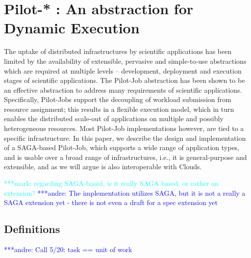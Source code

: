 \documentclass[]{article}
\newcommand{\jhanote}[1]{ {\textcolor{red} { ***shantenu: #1 }}}
\newcommand{\alnote}[1]{ {\textcolor{blue} { ***andre: #1 }}}
\newcommand{\msnote}[1]{ {\textcolor{cyan} { ***mark: #1 }}}
\newcommand{\alnote}[1]{}
\newcommand{\jhanote}[1]{}
\begin{document}
\section{Pilot-* : An abstraction for Dynamic Execution}

The uptake of distributed infrastructures by scientific applications
has been limited by the availability of extensible, pervasive and
simple-to-use abstractions which are required at multiple levels –
development, deployment and execution stages of scientific
applications. The Pilot-Job abstraction has been shown to be an
effective abstraction to address many requirements of scientific
applications. Specifically, Pilot-Jobs support the decoupling of
workload submission from resource assignment; this results in a
flexible execution model, which in turn enables the distributed
scale-out of applications on multiple and possibly heterogeneous
resources. Most Pilot-Job implementations however, are tied to a
specific infrastructure. In this paper, we describe the design and
implementation of a SAGA-based Pilot-Job, which supports a wide range
of application types, and is usable over a broad range of
infrastructures, i.e., it is general-purpose and extensible, and as we
will argue is also interoperable with Clouds.

\msnote{regarding SAGA-based, is it really SAGA based, or rather an
  extension?}\alnote{The implementation utilizes SAGA, but it is not a
  really a SAGA extension yet - there is not even a draft for a spec
  extension yet}



\subsection{Definitions}


\alnote{Call 5/20: task == unit of work}
\end{document}
